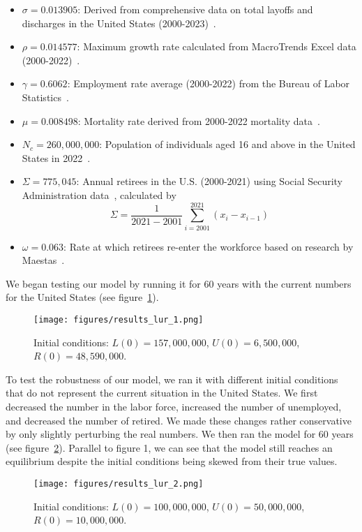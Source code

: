 \documentclass[11pt]{amsart}
\begin{document}
\begin{itemize}
    \item $\sigma = 0.013905$: Derived from comprehensive data on total layoffs and discharges in the United States (2000-2023)~\cite{FRED}.
    \item $\rho = 0.014577$: Maximum growth rate calculated from MacroTrends Excel data (2000-2022)~\cite{MacroTrends}.
    \item $\gamma = 0.6062$: Employment rate average (2000-2022) from the Bureau of Labor Statistics~\cite{BLS}.
    \item $\mu = 0.008498$: Mortality rate derived from 2000-2022 mortality data~\cite{usafacts}.
    \item $N_c = 260,000,000$: Population of individuals aged 16 and above in the United States in 2022~\cite{kidscount}.
    \item $\Sigma = 775,045$: Annual retirees in the U.S. (2000-2021) using Social Security Administration data~\cite{ssa}, calculated by
    \[
        \Sigma = \frac{1}{2021 - 2001}\sum_{i=2001}^{2021}(x_i - x_{i-1})
    \]
    \item $\omega = 0.063$: Rate at which retirees re-enter the workforce based on research by Maestas~\cite{maestas}.
\end{itemize}


We began testing our model by running it for 60 years with the current numbers for the United States (see figure~\ref{fig:results_lur_1}). 

\begin{figure}[h]
    \centering
    \texttt{[image: figures/results\_lur\_1.png]}
    \caption{Initial conditions: $L(0) = 157,000,000$, $U(0) = 6,500,000$, $R(0) = 48,590,000$.}
    \label{fig:results_lur_1}
\end{figure}

To test the robustness of our model, we ran it with different initial conditions that do not represent the current situation in the United States. 
We first decreased the number in the labor force, increased the number of unemployed, and decreased the number of retired. We made these changes rather conservative
by only slightly perturbing the real numbers. We then ran the model for 60 years (see figure~\ref{fig:results_lur_2}).
Parallel to figure 1, we can see that the model still reaches an equilibrium despite the initial conditions being skewed from their true values.

\begin{figure}[h]
    \centering
    \texttt{[image: figures/results\_lur\_2.png]}
    \caption{Initial conditions: $L(0) = 100,000,000$, $U(0) = 50,000,000$, $R(0) = 10,000,000$.}
    \label{fig:results_lur_2}
\end{figure}
\end{document}

